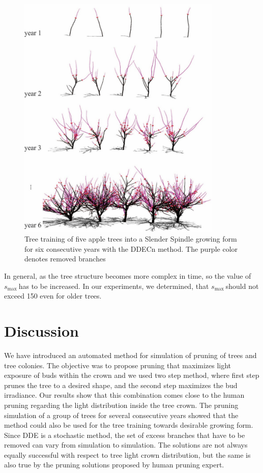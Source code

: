 \documentclass[1p]{elsarticle}
\begin{document}
\begin{figure}
    \centering
    \includegraphics[width=3.84333in,height=4.66333in]{figs/image7.jpeg}
    \caption{Tree training of five apple trees into a Slender
Spindle growing form for six consecutive years with the DDECn method.
The purple color denotes removed branches}
    \label{fig:my_label}
\end{figure}


In general, as the tree structure becomes more complex in time, so the
value of \(s_{\mathrm{\max}}\ \)has to be increased. In our experiments,
we determined, that \(s_{\mathrm{\max}}\ \)should not exceed 150 even
for older trees.

\section{Discussion}

We have introduced an automated method for simulation of pruning of
trees and tree colonies. The objective was to propose pruning that
maximizes light exposure of buds within the crown and we used two step
method, where first step prunes the tree to a desired shape, and the
second step maximizes the bud irradiance. Our results show that this
combination comes close to the human pruning regarding the light
distribution inside the tree crown. The pruning simulation of a group of
trees for several consecutive years showed that the method could also be
used for the tree training towards desirable growing form. Since DDE is
a stochastic method, the set of excess branches that have to be removed
can vary from simulation to simulation. The solutions are not always
equally successful with respect to tree light crown distribution, but
the same is also true by the pruning solutions proposed by human pruning
expert.
\end{document}
